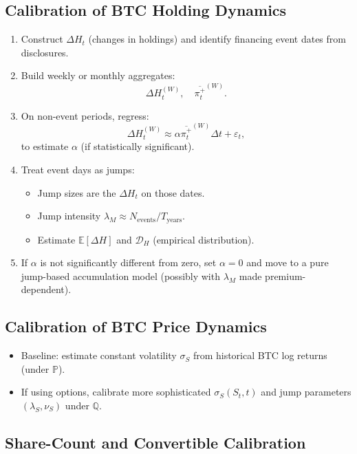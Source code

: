 \documentclass[11pt]{article}
\begin{document}
\subsection{Calibration of BTC Holding Dynamics}

\begin{enumerate}
  \item Construct $\Delta H_t$ (changes in holdings) and identify financing event dates from disclosures.
  \item Build weekly or monthly aggregates:
  $$
    \Delta H^{(W)}_t, \quad \overline{\pi_t^+}^{(W)}.
  $$
  \item On non-event periods, regress:
  $$
    \Delta H^{(W)}_t \approx \alpha \overline{\pi_t^+}^{(W)} \Delta t + \varepsilon_t,
  $$
  to estimate $\alpha$ (if statistically significant).
  \item Treat event days as jumps:
  \begin{itemize}
    \item Jump sizes are the $\Delta H_t$ on those dates.
    \item Jump intensity $\lambda_M \approx N_{\text{events}} / T_{\text{years}}$.
    \item Estimate $\mathbb E[\Delta H]$ and $\mathcal D_H$ (empirical distribution).
  \end{itemize}
  \item If $\alpha$ is not significantly different from zero, set $\alpha=0$ and move to a pure jump-based accumulation model (possibly with $\lambda_M$ made premium-dependent).
\end{enumerate}

\subsection{Calibration of BTC Price Dynamics}

\begin{itemize}
  \item Baseline: estimate constant volatility $\sigma_S$ from historical BTC log returns (under $\mathbb P$).
  \item If using options, calibrate more sophisticated $\sigma_S(S_t,t)$ and jump parameters $(\lambda_S,\nu_S)$ under $\mathbb Q$.
\end{itemize}

\subsection{Share-Count and Convertible Calibration}
\end{document}
